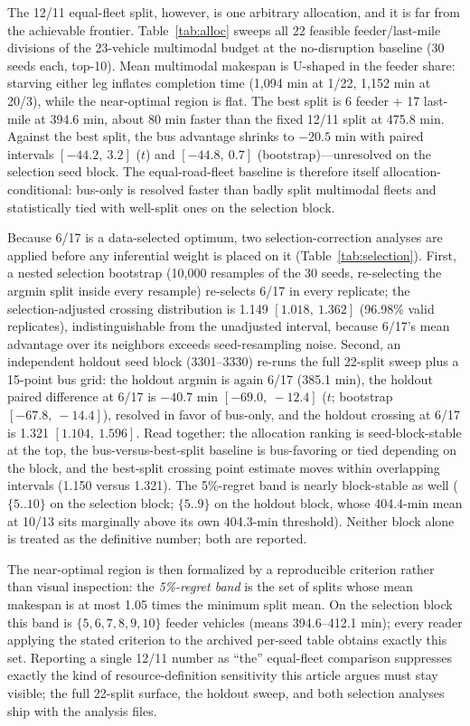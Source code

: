 \documentclass{ieeeaccess}
\begin{document}
The 12/11 equal-fleet split, however, is one arbitrary allocation, and it is far from the achievable frontier. Table~\ref{tab:alloc} sweeps all 22 feasible feeder/last-mile divisions of the 23-vehicle multimodal budget at the no-disruption baseline (30 seeds each, top-10). Mean multimodal makespan is U-shaped in the feeder share: starving either leg inflates completion time (1{,}094 min at 1/22, 1{,}152 min at 20/3), while the near-optimal region is flat. The best split is 6 feeder + 17 last-mile at 394.6 min, about 80 min faster than the fixed 12/11 split at 475.8 min. Against the best split, the bus advantage shrinks to $-20.5$ min with paired intervals $[-44.2,\ 3.2]$ ($t$) and $[-44.8,\ 0.7]$ (bootstrap)---unresolved on the selection seed block. The equal-road-fleet baseline is therefore itself allocation-conditional: bus-only is resolved faster than badly split multimodal fleets and statistically tied with well-split ones on the selection block.

Because 6/17 is a data-selected optimum, two selection-correction analyses are applied before any inferential weight is placed on it (Table~\ref{tab:selection}). First, a nested selection bootstrap (10{,}000 resamples of the 30 seeds, re-selecting the argmin split inside every resample) re-selects 6/17 in every replicate; the selection-adjusted crossing distribution is 1.149 $[1.018,\ 1.362]$ (96.98\% valid replicates), indistinguishable from the unadjusted interval, because 6/17's mean advantage over its neighbors exceeds seed-resampling noise. Second, an independent holdout seed block (3301--3330) re-runs the full 22-split sweep plus a 15-point bus grid: the holdout argmin is again 6/17 (385.1 min), the holdout paired difference at 6/17 is $-40.7$ min $[-69.0,\ -12.4]$ ($t$; bootstrap $[-67.8,\ -14.4]$), resolved in favor of bus-only, and the holdout crossing at 6/17 is 1.321 $[1.104,\ 1.596]$. Read together: the allocation ranking is seed-block-stable at the top, the bus-versus-best-split baseline is bus-favoring or tied depending on the block, and the best-split crossing point estimate moves within overlapping intervals (1.150 versus 1.321). The 5\%-regret band is nearly block-stable as well ($\{5..10\}$ on the selection block; $\{5..9\}$ on the holdout block, whose 404.4-min mean at 10/13 sits marginally above its own 404.3-min threshold). Neither block alone is treated as the definitive number; both are reported.

The near-optimal region is then formalized by a reproducible criterion rather than visual inspection: the \emph{5\%-regret band} is the set of splits whose mean makespan is at most 1.05 times the minimum split mean. On the selection block this band is $\{5,6,7,8,9,10\}$ feeder vehicles (means 394.6--412.1 min); every reader applying the stated criterion to the archived per-seed table obtains exactly this set. Reporting a single 12/11 number as ``the'' equal-fleet comparison suppresses exactly the kind of resource-definition sensitivity this article argues must stay visible; the full 22-split surface, the holdout sweep, and both selection analyses ship with the analysis files.
\end{document}

